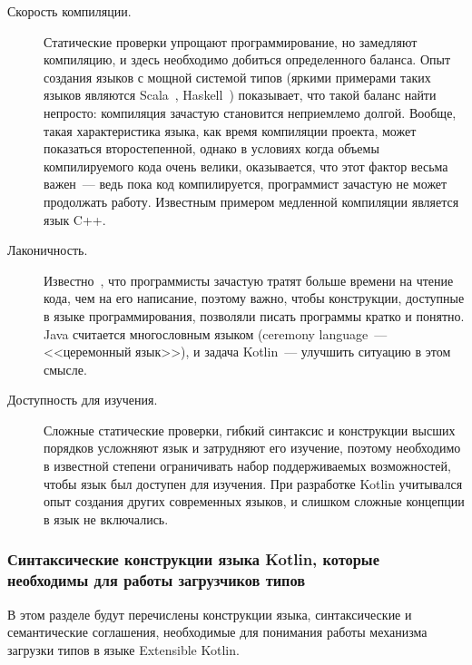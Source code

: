 \begin{description}
	\item[Скорость компиляции.] Статические проверки упрощают программирование, но замедляют компиляцию, и здесь необходимо добиться определенного баланса. Опыт создания языков с мощной системой типов (яркими примерами таких языков являются Scala~\cite{scala-spec}, Haskell~\cite{haskell98}) показывает, что такой баланс найти непросто: компиляция зачастую становится неприемлемо долгой.
	Вообще, такая характеристика языка, как время компиляции проекта, может показаться второстепенной, однако в условиях когда объемы компилируемого кода очень велики, оказывается, что этот фактор весьма важен~--- ведь пока код компилируется, программист зачастую не может продолжать работу. Известным примером медленной компиляции является язык C++.

	\item[Лаконичность.] Известно~\cite{codecomplete}, что программисты зачастую тратят больше времени на чтение кода, чем на его написание, поэтому важно, чтобы конструкции, доступные в языке программирования, позволяли писать программы кратко и понятно.
	Java считается многословным языком (ceremony language~--- <<церемонный язык>>), и задача Kotlin~--- улучшить ситуацию в этом смысле.

	\item[Доступность для изучения.] Сложные статические проверки, гибкий синтаксис и конструкции высших порядков усложняют язык и затрудняют его изучение, поэтому необходимо в известной степени ограничивать набор поддерживаемых возможностей, чтобы язык был доступен для изучения. При разработке Kotlin учитывался опыт создания других современных языков, и слишком сложные концепции в язык не включались.
\end{description}

\subsubsection{Синтаксические конструкции языка Kotlin, которые необходимы для работы загрузчиков типов}

В этом разделе будут перечислены конструкции языка, синтаксические и семантические соглашения, необходимые для понимания работы механизма загрузки типов в языке Extensible Kotlin. 

